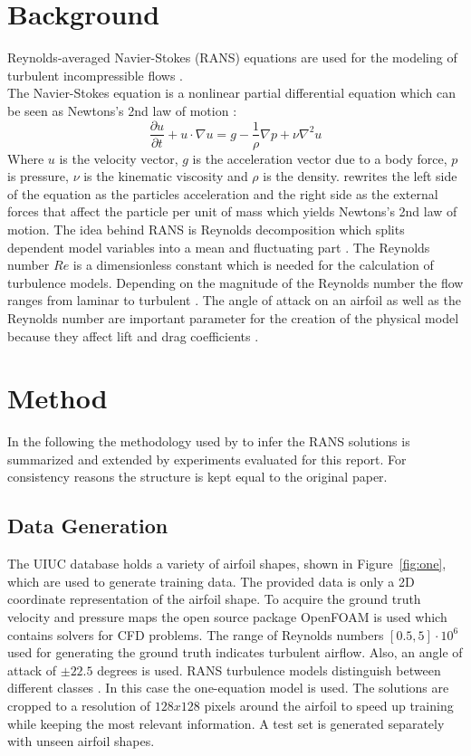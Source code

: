 \documentclass[acmtog]{techreportacmart}
\begin{document}
\section{Background}
Reynolds-averaged Navier-Stokes (RANS) equations are used for the modeling of turbulent incompressible flows \cite{Alfonsi}. \\
The Navier-Stokes equation is a nonlinear partial differential equation which can be seen as Newtons's 2nd law of motion \cite{BISTAFA2018}:
\begin{equation}
\label{eqn:01}
\frac{\partial{u}}{\partial{t}} + u \cdot \nabla u = g - \frac{1}{\rho} \nabla p + \nu \nabla^{2}u
\end{equation}
Where $u$ is the velocity vector, $g$ is the acceleration vector due to a body force, $p$ is pressure, 
$\nu$ is the kinematic viscosity and $\rho$ is the density. \cite{BISTAFA2018} rewrites the left side 
of the equation as the particles acceleration and the right side as the external forces that affect 
the particle per unit of mass which yields Newtons's 2nd law of motion. The idea behind RANS is Reynolds 
decomposition which splits dependent model variables into a mean and fluctuating part \cite{Alfonsi}. 
The Reynolds number $Re$ is a dimensionless constant which is needed for the calculation of turbulence 
models. Depending on the magnitude of the Reynolds number the flow ranges from laminar to turbulent 
\cite{lissaman1983}. The angle of attack on an airfoil as well as the Reynolds number are important 
parameter for the creation of the physical model because they affect lift and drag coefficients \cite{lissaman1983}. 

\section{Method}
In the following the methodology used by \cite{Thuerey20} to infer the RANS solutions is summarized and 
extended by experiments evaluated for this report. For consistency reasons the structure is kept equal to the original paper.

\subsection{Data Generation}
The UIUC database \cite{airfoil} holds a variety of airfoil shapes, shown in Figure~\ref{fig:one}, which 
are used to generate training data. The provided data is only a 2D coordinate representation of the 
airfoil shape. To acquire the ground truth velocity and pressure maps the open source package OpenFOAM is 
used which contains solvers for CFD problems. The range of Reynolds numbers $[0.5, 5] \cdot 10^{6}$ used 
for generating the ground truth indicates turbulent airflow. Also, an angle of attack of $\pm 22.5$ degrees 
is used. RANS turbulence models distinguish between different classes \cite{Alfonsi}. In this case the 
one-equation model is used. The solutions are cropped to a resolution of $128x128$ pixels around the 
airfoil to speed up training while keeping the most relevant information. 
A test set is generated separately with unseen airfoil shapes.
\end{document}
